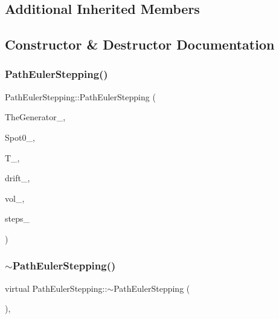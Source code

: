 \subsection*{Additional Inherited Members}


\subsection{Constructor \& Destructor Documentation}
\hypertarget{classPathEulerStepping_ae05c03118547af2589fbad9566497140}{}\label{classPathEulerStepping_ae05c03118547af2589fbad9566497140} 
\subsubsection{\texorpdfstring{Path\+Euler\+Stepping()}{PathEulerStepping()}}
{\footnotesize\ttfamily Path\+Euler\+Stepping\+::\+Path\+Euler\+Stepping (\begin{DoxyParamCaption}\item[{shared\+\_\+ptr$<$ \hyperlink{classRandomBase}{Random\+Base} $>$}]{The\+Generator\+\_\+,  }\item[{double}]{Spot0\+\_\+,  }\item[{double}]{T\+\_\+,  }\item[{const \hyperlink{classParameters}{Parameters} \&}]{drift\+\_\+,  }\item[{const \hyperlink{classParameters}{Parameters} \&}]{vol\+\_\+,  }\item[{unsigned long}]{steps\+\_\+ }\end{DoxyParamCaption})}

\hypertarget{classPathEulerStepping_a057260b4f22fdd8a9816047e1552960e}{}\label{classPathEulerStepping_a057260b4f22fdd8a9816047e1552960e} 
\subsubsection{\texorpdfstring{$\sim$\+Path\+Euler\+Stepping()}{~PathEulerStepping()}}
{\footnotesize\ttfamily virtual Path\+Euler\+Stepping\+::$\sim$\+Path\+Euler\+Stepping (\begin{DoxyParamCaption}{ }\end{DoxyParamCaption})\hspace{0.3cm}{\ttfamily [inline]}, {\ttfamily [virtual]}}



